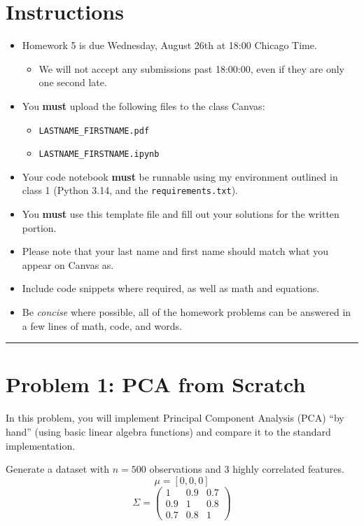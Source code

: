 \documentclass[11pt, letterpaper]{article}
\newcommand{\problem}[1]{\section*{Problem #1}}
\begin{document}
\section*{Instructions}
\begin{itemize}
    \item Homework 5 is due Wednesday, August 26th at 18:00 Chicago Time.
    \begin{itemize}
        \item We will not accept any submissions past 18:00:00, even if they are only one second late.
    \end{itemize}
    \item You \textbf{must} upload the following files to the class Canvas:
    \begin{itemize}
        \item \texttt{LASTNAME\_FIRSTNAME.pdf}
        \item \texttt{LASTNAME\_FIRSTNAME.ipynb}
    \end{itemize}
    \item Your code notebook \textbf{must} be runnable using my environment outlined in class 1 (Python 3.14, and the \texttt{requirements.txt}).
    \item You \textbf{must} use this template file and fill out your solutions for the written portion.
    \item Please note that your last name and first name should match what you appear on Canvas as.
    \item Include code snippets where required, as well as math and equations.
    \item Be \textit{concise} where possible, all of the homework problems can be answered in a few lines of math, code, and words.
\end{itemize}
\hrule
\vspace{0.5cm}

\pagebreak

\problem{1: PCA from Scratch}

In this problem, you will implement Principal Component Analysis (PCA) ``by hand'' (using basic linear algebra functions) and compare it to the standard implementation.

Generate a dataset with $n=500$ observations and 3 highly correlated features.
$$ \mu = [0, 0, 0] $$
$$ \Sigma = \begin{pmatrix} 1 & 0.9 & 0.7 \\ 0.9 & 1 & 0.8 \\ 0.7 & 0.8 & 1 \end{pmatrix} $$
\end{document}
